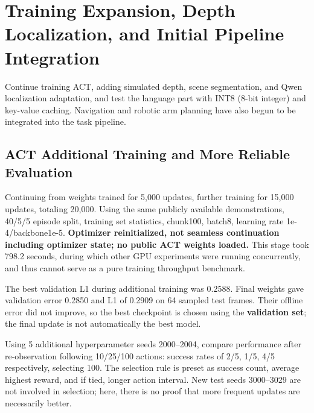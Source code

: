 
\FloatBarrier

\section{Training Expansion, Depth Localization, and Initial Pipeline Integration}

\label{stage:s04}

Continue training ACT, adding simulated depth, scene segmentation, and Qwen localization adaptation, and test the language part with INT8 (8-bit integer) and key-value caching. Navigation and robotic arm planning have also begun to be integrated into the task pipeline.

\subsection{ACT Additional Training and More Reliable Evaluation}\label{s04-detail-1}

Continuing from weights trained for 5,000 updates, further training for 15,000 updates, totaling 20,000. Using the same publicly available demonstrations, 40/5/5 episode split, training set statistics, chunk100, batch8, learning rate 1e-4/backbone1e-5. \textbf{Optimizer reinitialized, not seamless continuation including optimizer state; no public ACT weights loaded.} This stage took 798.2 seconds, during which other GPU experiments were running concurrently, and thus cannot serve as a pure training throughput benchmark.

The best validation L1 during additional training was 0.2588. Final weights gave validation error 0.2850 and L1 of 0.2909 on 64 sampled test frames. Their offline error did not improve, so the best checkpoint is chosen using the \textbf{validation set}; the final update is not automatically the best model.


Using 5 additional hyperparameter seeds 2000--2004, compare performance after re-observation following 10/25/100 actions: success rates of 2/5, 1/5, 4/5 respectively, selecting 100. The selection rule is preset as success count, average highest reward, and if tied, longer action interval. New test seeds 3000--3029 are not involved in selection; here, there is no proof that more frequent updates are necessarily better.

